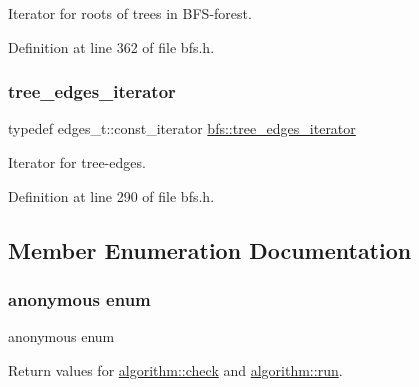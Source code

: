 Iterator for roots of trees in B\+F\+S-\/forest. 



Definition at line 362 of file bfs.\+h.

\mbox{\label{classbfs_a04e608fe18089e5495cadb995aa75261}} 
\subsubsection{\texorpdfstring{tree\+\_\+edges\+\_\+iterator}{tree\_edges\_iterator}}
{\footnotesize\ttfamily typedef edges\+\_\+t\+::const\+\_\+iterator \mbox{\hyperlink{classbfs_a04e608fe18089e5495cadb995aa75261}{bfs\+::tree\+\_\+edges\+\_\+iterator}}}



Iterator for tree-\/edges. 



Definition at line 290 of file bfs.\+h.



\subsection{Member Enumeration Documentation}
\mbox{\label{classalgorithm_af1a0078e153aa99c24f9bdf0d97f6710}} 
\subsubsection{\texorpdfstring{anonymous enum}{anonymous enum}}
{\footnotesize\ttfamily anonymous enum\hspace{0.3cm}{\ttfamily [inherited]}}



Return values for \mbox{\hyperlink{classalgorithm_a76361fb03ad1cf643affc51821e43bed}{algorithm\+::check}} and \mbox{\hyperlink{classalgorithm_a734b189509a8d6b56b65f8ff772d43ca}{algorithm\+::run}}. 

